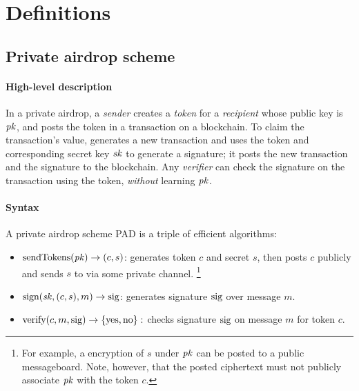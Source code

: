 \section{Definitions}\label{sec:defs}

\subsection{Private airdrop scheme}

\paragraph{High-level description} In a private airdrop, a \emph{sender} \Sr creates a \emph{token}
    for a \emph{recipient} \Rt whose public key is $\mathit{pk}$, and posts
    the token in a transaction on a blockchain.
To claim the transaction's value, \Rt generates a new transaction and
    uses the token and corresponding secret key $\mathit{sk}$ to generate a signature; it posts the
    new transaction and the signature to the blockchain.
Any \emph{verifier} \Vr can check the signature on the transaction
    using the token, \emph{without} learning $\mathit{pk}$.

\paragraph{Syntax} A private airdrop scheme PAD is a triple of efficient algorithms:
%
\begin{itemize}
\item $\text{sendTokens}(\mathit{pk}) \to (c, s)$:
%
\Sr generates token $c$ and secret $s$, then posts $c$ publicly and sends $s$
    to \Rt via some private channel.
\unskip\footnote{For example, a encryption of $s$ under $\mathit{pk}$ can be posted
    to a public messageboard. Note, however, that the posted ciphertext
    must not publicly associate $\mathit{pk}$ with the token $c$.}

\item $\text{sign}(\mathit{sk}, (c, s), m) \to \text{sig}$:
\Rt generates signature $\text{sig}$ over message $m$.

\item $\text{verify}(c, m, \text{sig}) \to \{\text{yes},\text{no}\}:$
\Vr checks signature $\text{sig}$ on message $m$ for token $c$.
\end{itemize}

